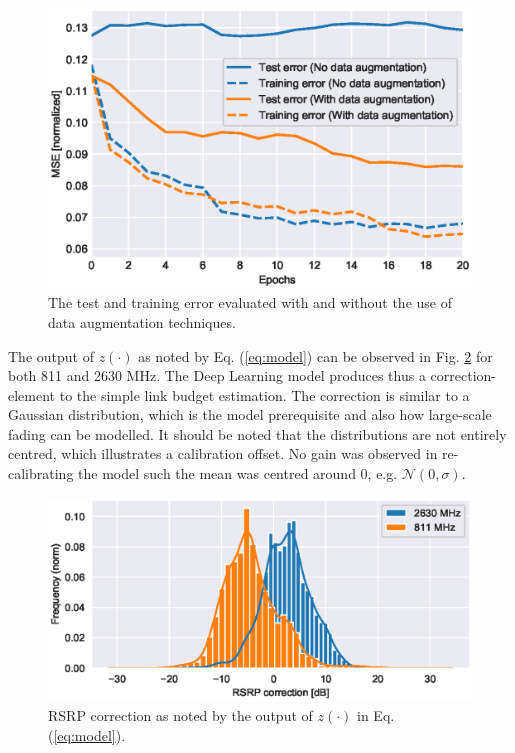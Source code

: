 \begin{figure}
    \centering
    \includegraphics{chapters/part_pathloss/model_aided_paper/dataaugmentation_training_test_error.eps}
    \caption{The test and training error evaluated with and without the use of data augmentation techniques.}
    \label{fig:dataaugmentation_training_test_error}
\end{figure}

The output of $z(\cdot)$ as noted by Eq. (\ref{eq:model}) can be observed in Fig. \ref{fig:rsrp_correction_hist} for both 811 and 2630 MHz. The Deep Learning model produces thus a correction-element to the simple link budget estimation. The correction is similar to a Gaussian distribution, which is the model prerequisite and also how large-scale fading can be modelled. It should be noted that the distributions are not entirely centred, which illustrates a calibration offset. No gain was observed in re-calibrating the model such the mean was centred around $0$, e.g. $\mathcal{N}(0, \sigma)$.

\begin{figure}
    \centering
    \includegraphics{chapters/part_pathloss/model_aided_paper/rsrp_correction_hist.eps}
    \caption{RSRP correction as noted by the output of $z(\cdot)$ in Eq. (\ref{eq:model}).}
    \label{fig:rsrp_correction_hist}
\end{figure}

